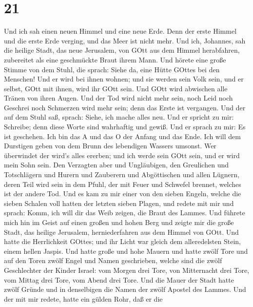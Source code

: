 \hypertarget{section-19}{%
\section{21}\label{section-19}}

 Und ich sah einen neuen Himmel und eine neue Erde. Denn der
erste Himmel und die erste Erde verging, und das Meer ist nicht mehr.
 Und ich, Johannes, sah die heilige Stadt, das neue
Jerusalem, von GOtt aus dem Himmel herabfahren, zubereitet als eine
geschmückte Braut ihrem Mann.  Und hörete eine große Stimme
von dem Stuhl, die sprach: Siehe da, eine Hütte GOttes bei den Menschen!
Und er wird bei ihnen wohnen; und sie werden sein Volk sein, und er
selbst, GOtt mit ihnen, wird ihr GOtt sein.  Und GOtt wird
abwischen alle Tränen von ihren Augen. Und der Tod wird nicht mehr sein,
noch Leid noch Geschrei noch Schmerzen wird mehr sein; denn das Erste
ist vergangen.  Und der auf dem Stuhl saß, sprach: Siehe,
ich mache alles neu. Und er spricht zu mir: Schreibe; denn diese Worte
sind wahrhaftig und gewiß.  Und er sprach zu mir: Es ist
geschehen. Ich bin das A und das O der Anfang und das Ende. Ich will dem
Durstigen geben von dem Brunn des lebendigen Wassers umsonst.
 Wer überwindet der wird's alles ererben; und ich werde sein
GOtt sein, und er wird mein Sohn sein.  Den Verzagten aber
und Ungläubigen, den Greulichen und Totschlägern und Hurern und
Zauberern und Abgöttischen und allen Lügnern, deren Teil wird sein in
dem Pfuhl, der mit Feuer und Schwefel brennet, welches ist der andere
Tod.  Und es kam zu mir einer von den sieben Engeln, welche
die sieben Schalen voll hatten der letzten sieben Plagen, und redete mit
mir und sprach: Komm, ich will dir das Weib zeigen, die Braut des
Lammes.  Und führete mich hin im Geist auf einen großen und
hohen Berg und zeigte mir die große Stadt, das heilige Jerusalem,
herniederfahren aus dem Himmel von GOtt.  Und hatte die
Herrlichkeit GOttes; und ihr Licht war gleich dem alleredelsten Stein,
einem hellen Jaspis.  Und hatte große und hohe Mauern und
hatte zwölf Tore und auf den Toren zwölf Engel und Namen geschrieben,
welche sind die zwölf Geschlechter der Kinder Israel:  vom
Morgen drei Tore, von Mitternacht drei Tore, vom Mittag drei Tore, vom
Abend drei Tore.  Und die Mauer der Stadt hatte zwölf
Gründe und in denselbigen die Namen der zwölf Apostel des Lammes.
 Und der mit mir redete, hatte ein gülden Rohr, daß er die
